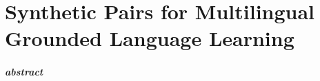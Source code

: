 %
%










\chapter{Synthetic Pairs for Multilingual Grounded Language Learning}
\label{ch:EMNLP}

\paragraph{abstract}

